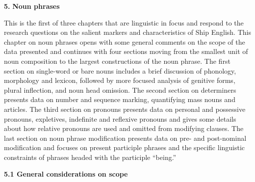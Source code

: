 \clearpage\begin{styleStandard}
\textbf{5.} \textbf{Noun phrases}
\end{styleStandard}


\begin{styleStandard}
This is the first of three chapters that are linguistic in focus and respond to the research questions on the salient markers and characteristics of Ship English. This chapter on noun phrases opens with some general comments on the scope of the data presented and continues with four sections moving from the smallest unit of noun composition to the largest constructions of the noun phrase. The first section on single-word or bare nouns includes a brief discussion of phonology, morphology and lexicon, followed by more focused analysis of genitive forms, plural inflection, and noun head omission. The second section on determiners presents data on number and sequence marking, quantifying mass nouns and articles. The third section on pronouns presents data on personal and possessive pronouns, expletives, indefinite and reflexive pronouns and gives some details about how relative pronouns are used and omitted from modifying clauses. The last section on noun phrase modification presents data on pre- and post-nominal modification and focuses on present participle phrases and the specific linguistic constraints of phrases headed with the participle “being.” 
\end{styleStandard}


\begin{styleStandard}
\textbf{5.1 General considerations on scope}
\end{styleStandard}


